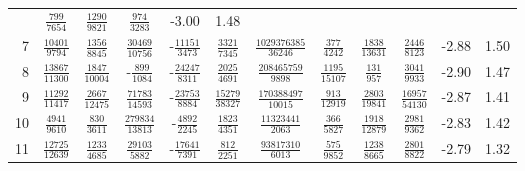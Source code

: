 \begin{sidewaystable}
\begin{tabular}{r|ccccccccc|c@{ -- }c@{\%}}
&  $\frac{             799}{            7654}$
&  $\frac{            1290}{            9821}$
&  $\frac{             974}{            3283}$
&  -3.00 &  1.48
\\
7
&  $\frac{           10401}{            9794}$
&  $\frac{            1356}{            8845}$
&  $\frac{           30469}{           10756}$
& -$\frac{           11151}{            3473}$
&  $\frac{            3321}{            7345}$
&  $\frac{      1029376385}{           36246}$
&  $\frac{             377}{            4242}$
&  $\frac{            1838}{           13631}$
&  $\frac{            2446}{            8123}$
&  -2.88 &  1.50
\\
8
&  $\frac{           13867}{           11300}$
&  $\frac{            1847}{           10004}$
& -$\frac{             899}{            1084}$
& -$\frac{           24247}{            8311}$
&  $\frac{            2025}{            4691}$
&  $\frac{       208465759}{            9898}$
&  $\frac{            1195}{           15107}$
&  $\frac{             131}{             957}$
&  $\frac{            3041}{            9933}$
&  -2.90 &  1.47
\\
9
&  $\frac{           11292}{           11417}$
&  $\frac{            2667}{           12475}$
&  $\frac{           71783}{           14593}$
& -$\frac{           23753}{            8884}$
&  $\frac{           15279}{           38327}$
&  $\frac{       170388497}{           10015}$
&  $\frac{             913}{           12919}$
&  $\frac{            2803}{           19841}$
&  $\frac{           16957}{           54130}$
&  -2.87 &  1.41
\\
10
&  $\frac{            4941}{            9610}$
&  $\frac{             830}{            3611}$
&  $\frac{          279834}{           13813}$
& -$\frac{            4892}{            2245}$
&  $\frac{            1823}{            4351}$
&  $\frac{        11323441}{            2063}$
&  $\frac{             366}{            5827}$
&  $\frac{            1918}{           12879}$
&  $\frac{            2981}{            9362}$
&  -2.83 &  1.42
\\
11
&  $\frac{           12725}{           12639}$
&  $\frac{            1233}{            4685}$
&  $\frac{           29103}{            5882}$
& -$\frac{           17641}{            7391}$
&  $\frac{             812}{            2251}$
&  $\frac{        93817310}{            6013}$
&  $\frac{             575}{            9852}$
&  $\frac{            1238}{            8665}$
&  $\frac{            2801}{            8822}$
&  -2.79 &  1.32
\\

\end{tabular}
\end{sidewaystable}
